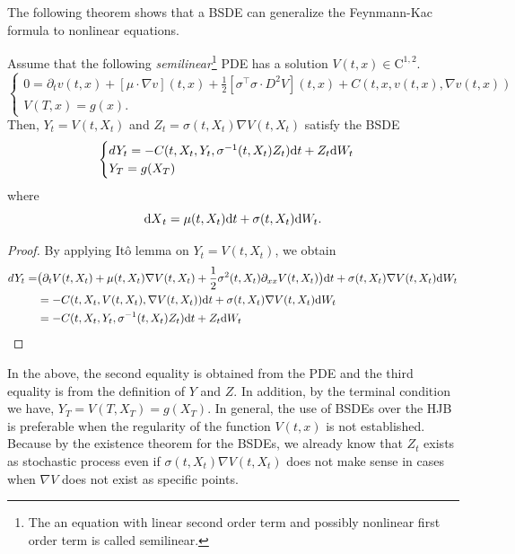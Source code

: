 \documentclass[11pt]{book}
\newcommand{\dt}{\text{\normalfont d}t}
\newcommand{\dX}{\text{\normalfont d}X}
\newcommand{\dW}{\text{\normalfont d}W}
\begin{document}
The following theorem shows that a BSDE can generalize the Feynmann-Kac formula to nonlinear equations.
\begin{thm}\label{thm:Markov_BSDE}
Assume that the following \emph{semilinear}\footnote{The an equation with linear second order term and possibly nonlinear first order term is called semilinear.} PDE has a solution $V(t,x)\in\mathrm{C}^{1,2}$.
\begin{equation}\label{eqn:semilinear_PDE}
\begin{cases}
0=\partial_{t}v(t,x)+[\mu\cdot{\nabla}v](t,x)+\frac12[{\sigma^\intercal\sigma\cdot}D^2V](t,x)+C(t,x,v(t,x),\nabla v(t,x))\\
V(T,x)=g(x).
\end{cases}		
\end{equation}
Then, $Y_t=V(t,X_t)$ and  $Z_t=\sigma(t,X_t)\nabla V(t,X_t)$ satisfy the BSDE
\begin{equation}\label{eqn:Markov_BSDE}
\begin{cases}
dY_t=- C(t,X_t,Y_t,\sigma^{-1}(t,X_t)Z_t){{\dt}}+Z_t\dW_t\\
Y_T=g(X_T)
\end{cases}
\end{equation}
where 
\begin{equation}
{\dX}_t=\mu(t,X_t){{\dt}}+\sigma(t,X_t)\dW_t.
\end{equation}
\end{thm}
\begin{proof}
By applying It\^o lemma on $Y_t=V(t,X_t)$, we obtain
\begin{equation}
\begin{split}
dY_t=&\big(\partial_{t}V(t,X_t)+\mu(t,X_t)\nabla V(t,X_t)+\frac12{\sigma^2(t,X_t)}\partial_{xx}V(t,X_t)\big){{\dt}}+\sigma(t,X_t)\nabla V(t,X_t)\dW_t\\
&=-C(t,X_t,V(t,X_t),\nabla V(t,X_t)){{\dt}}+\sigma(t,X_t)\nabla V(t,X_t)\dW_t\\
&=- C(t,X_t,Y_t,\sigma^{-1}(t,X_t)Z_t){{\dt}}+Z_t\dW_t
\end{split}
\end{equation}
\end{proof}

In the above, the second equality is obtained from the PDE and the third equality is from the definition of $Y$ and $Z$. In addition, by the terminal condition we have, $Y_T=V(T,X_T)=g(X_T)$.
In general, the use of BSDEs over the HJB is  preferable when the regularity of the function $V(t,x)$ is not established. Because by the existence theorem for the BSDEs, we already know that  $Z_t$ exists as stochastic process even if $\sigma(t,X_t)\nabla V(t,X_t)$ does not make sense in cases when $\nabla V$ does not exist as specific points.
\end{document}
